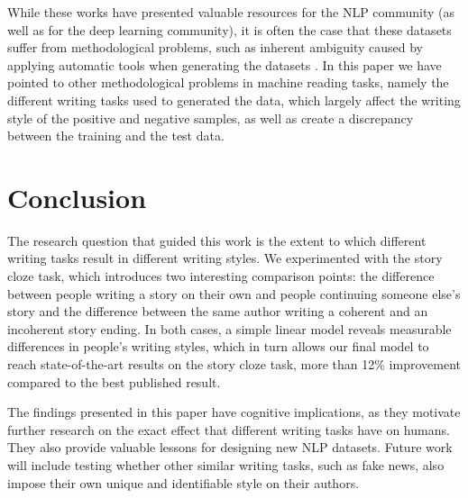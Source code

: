 \documentclass[11pt,a4paper]{article}
\newcommand{\isectionb}[1]{\section{#1}\label{ssec:#1}}
\begin{document}
While these works have presented valuable resources for the NLP community (as well as for the deep learning community), 
it is often the case that these datasets suffer from methodological problems, such as inherent ambiguity caused by applying automatic tools when generating the datasets \cite{Chen:2016}. 
In this paper we have pointed to other methodological problems in  machine reading tasks, namely the different writing tasks used to generated the data, which largely affect the writing style of the positive and negative samples, as well as create a discrepancy between the training and the test data.


\isectionb{Conclusion}

The research question that guided this work is the extent to which different writing tasks result in different writing styles.
We experimented with the story cloze task, which introduces two interesting comparison points: %
 the difference between people writing a story on their own and people continuing someone else's story 
 and the difference between the same author writing a coherent and an incoherent story ending.
In both cases, a simple linear model reveals measurable differences in people's writing styles, %
which in turn allows our final 
model to reach state-of-the-art results on the story cloze task, more than 12\% improvement compared to the best published result.

The findings presented in this paper have  cognitive implications, as they motivate further research on the exact effect that different writing tasks have on humans.
They also provide valuable lessons for designing new NLP datasets.
Future work will include testing whether other similar writing tasks, such as fake news, also impose their own unique and identifiable style on their authors.




%
%

\newpage


\end{document}
